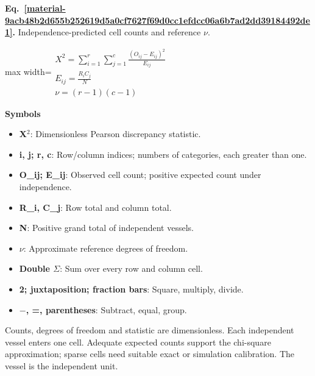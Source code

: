 \documentclass[11pt,a4paper]{article}
\begin{document}
\par\medskip
\noindent\begin{minipage}{\linewidth}
\label{material-9acb48b2d655b252619d5a0cf7627f69d0cc1efdcc06a6b7ad2dd39184492de1}
\noindent\textbf{Eq.~\ref*{material-9acb48b2d655b252619d5a0cf7627f69d0cc1efdcc06a6b7ad2dd39184492de1}.} Independence-predicted cell counts and reference \ensuremath{\nu}.\par\nopagebreak
\begin{center}\begin{adjustbox}{max width=\linewidth}$\displaystyle \begin{gathered}X^2=\sum_{i=1}^{r}\sum_{j=1}^{c}\frac{(O_{ij}-E_{ij})^2}{E_{ij}}\\E_{ij}=\frac{R_i C_j}{N}\\\nu=(r-1)(c-1)\end{gathered}$\end{adjustbox}\end{center}

\par\noindent\textbf{Symbols}

\begin{itemize}\setlength{\itemsep}{1pt}\setlength{\parsep}{0pt}
\item \textbf{X\ensuremath{{}^2}}: Dimensionless Pearson discrepancy statistic.
\item \textbf{i, j; r, c}: Row/column indices; numbers of categories, each greater than one.
\item \textbf{O\_ij; E\_ij}: Observed cell count; positive expected count under independence.
\item \textbf{R\_i, C\_j}: Row total and column total.
\item \textbf{N}: Positive grand total of independent vessels.
\item \textbf{\ensuremath{\nu}}: Approximate reference degrees of freedom.
\item \textbf{Double \ensuremath{\Sigma}}: Sum over every row and column cell.
\item \textbf{2; juxtaposition; fraction bars}: Square, multiply, divide.
\item \textbf{\ensuremath{-}, =, parentheses}: Subtract, equal, group.
\end{itemize}

Counts, degrees of freedom and statistic are dimensionless. Each independent vessel enters one cell. Adequate expected counts support the chi-square approximation; sparse cells need suitable exact or simulation calibration. The vessel is the independent unit.

\end{minipage}\par
\medskip
\end{document}

